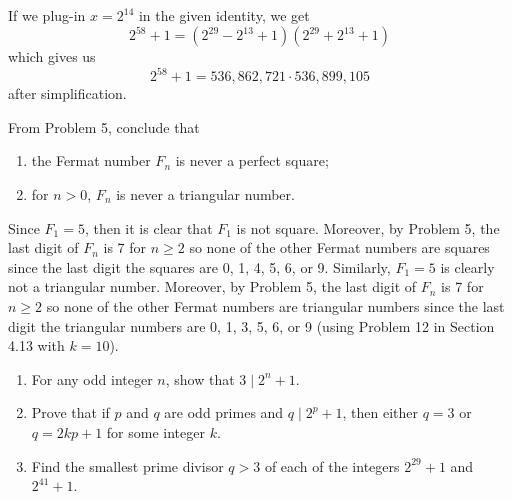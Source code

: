 \begin{solution}
    If we plug-in $x = 2^{14}$ in the given identity, we get
    $$2^{58} + 1 = (2^{29} - 2^{13} + 1)(2^{29} + 2^{13} + 1)$$
    which gives us
    $$2^{58} + 1 = 536,862,721\cdot 536,899,105$$
    after simplification. \\
\end{solution}

\begin{exercise}
    From Problem 5, conclude that 
    \begin{enumerate}
        \item the Fermat number $F_n$ is never a perfect square;
        \item for $n > 0$, $F_n$ is never a triangular number. \\
    \end{enumerate}
\end{exercise}

\begin{solution}
    Since $F_1 = 5$, then it is clear that $F_1$ is not square. Moreover, by Problem 5, the last digit of $F_n$ is 7 for $n \geq 2$ so none of the other Fermat numbers are squares since the last digit the squares are 0, 1, 4, 5, 6, or 9. Similarly, $F_1 = 5$ is clearly not a triangular number. Moreover, by Problem 5, the last digit of $F_n$ is 7 for $n \geq 2$ so none of the other Fermat numbers are triangular numbers since the last digit the triangular numbers are 0, 1, 3, 5, 6, or 9 (using Problem 12 in Section 4.13 with $k = 10$). \\
\end{solution}

\begin{exercise}
    \begin{enumerate}
        \item For any odd integer $n$, show that $3 \mid 2^n + 1$.
        \item Prove that if $p$ and $q$ are odd primes and $q \mid 2^p + 1$, then either $q = 3$ or $q = 2kp+1$ for some integer $k$. 
        \item Find the smallest prime divisor $q > 3$ of each of the integers $2^{29} + 1$ and $2^{41} + 1$.\\
    \end{enumerate}
\end{exercise}

